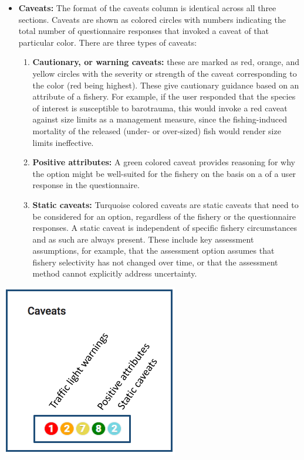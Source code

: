 \documentclass[11pt,]{book}
\providecommand{\tightlist}{%
  \setlength{\itemsep}{0pt}\setlength{\parskip}{0pt}}
\begin{document}
\begin{itemize}
\item
  \textbf{Caveats:} The format of the caveats column is identical across all three sections. Caveats are shown as colored circles with numbers indicating the total number of questionnaire responses that invoked a caveat of that particular color. There are three types of caveats:

  \begin{enumerate}
  \def\labelenumi{\arabic{enumi}.}
  \tightlist
  \item
    \textbf{Cautionary, or warning caveats:} these are marked as red, orange, and yellow circles with the severity or strength of the caveat corresponding to the color (red being highest). These give cautionary guidance based on an attribute of a fishery. For example, if the user responded that the species of interest is susceptible to barotrauma, this would invoke a red caveat against size limits as a management measure, since the fishing-induced mortality of the released (under- or over-sized) fish would render size limits ineffective.
  \item
    \textbf{Positive attributes:} A green colored caveat provides reasoning for why the option might be well-suited for the fishery on the basis on a of a user response in the questionnaire.
  \item
    \textbf{Static caveats:} Turquoise colored caveats are static caveats that need to be considered for an option, regardless of the fishery or the questionnaire responses. A static caveat is independent of specific fishery circumstances and as such are always present. These include key assessment assumptions, for example, that the assessment option assumes that fishery selectivity has not changed over time, or that the assessment method cannot explicitly address uncertainty.
  \end{enumerate}
\end{itemize}

\begin{center}\includegraphics[width=0.35\linewidth]{images/caveats} \end{center}
\end{document}
